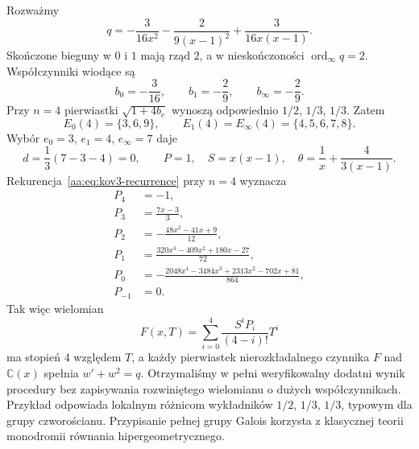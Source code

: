 \begin{przyklad}
\label{aa:prz:kov3-tetrahedral}
Rozważmy
\begin{equation}\label{aa:eq:kov3-tetra-q}
 q=-\frac3{16x^2}
    -\frac2{9(x-1)^2}
    +\frac3{16x(x-1)}.
\end{equation}
Skończone bieguny
w $0$ i $1$ mają rząd $2$,
a w nieskończoności
$\operatorname{ord}_\infty q=2$.
Współczynniki wiodące są
\[
 b_0=-\frac3{16},\qquad
 b_1=-\frac29,\qquad
 b_\infty=-\frac29.
\]
Przy $n=4$ pierwiastki
$\sqrt{1+4b_c}$ wynoszą
odpowiednio $1/2$, $1/3$, $1/3$.
Zatem
\[
 E_0(4)=\{3,6,9\},\qquad
 E_1(4)=E_\infty(4)=\{4,5,6,7,8\}.
\]
Wybór
$e_0=3$, $e_1=4$,
$e_\infty=7$ daje
\[
 d=\frac13(7-3-4)=0,\qquad
 P=1,\quad
 S=x(x-1),\quad
 \theta=\frac1x+\frac4{3(x-1)}.
\]
Rekurencja~\eqref{aa:eq:kov3-recurrence}
przy $n=4$ wyznacza
\[
\begin{aligned}
 P_4&=-1,\\
 P_3&=\frac{7x-3}{3},\\
 P_2&=-\frac{48x^2-41x+9}{12},\\
 P_1&=\frac{320x^3-409x^2+180x-27}{72},\\
 P_0&=-\frac{2048x^4-3484x^3+2313x^2
                -702x+81}{864},\\
 P_{-1}&=0.
\end{aligned}
\]
Tak więc wielomian
\[
 F(x,T)=\sum_{i=0}^{4}
       \frac{S^iP_i}{(4-i)!}T^i
\]
ma stopień $4$ względem $T$,
a każdy pierwiastek
nierozkładalnego czynnika
$F$ nad $\mathbb C(x)$
spełnia $w'+w^2=q$.
Otrzymaliśmy w pełni
weryfikowalny dodatni wynik
procedury bez zapisywania
rozwiniętego wielomianu
o dużych współczynnikach.
Przykład odpowiada
lokalnym różnicom wykładników
$1/2$, $1/3$, $1/3$,
typowym dla grupy czworościanu.
Przypisanie pełnej grupy
Galois korzysta z klasycznej
teorii monodromii
równania hipergeometrycznego.
\end{przyklad}

